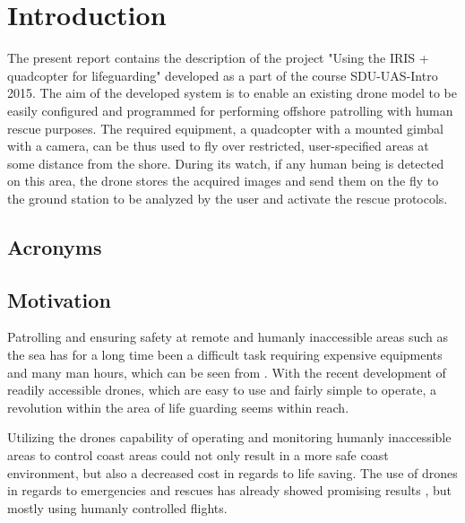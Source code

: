\chapter*{Introduction}

The present report contains the description of the  project "Using the IRIS + quadcopter for lifeguarding" developed as a part of the course  SDU-UAS-Intro 2015. 
The aim of the developed system is to enable an existing drone model to be easily configured and programmed for performing offshore patrolling with human rescue purposes. 
The required equipment, a quadcopter with a mounted gimbal with a camera, can be thus used to fly over restricted, user-specified areas at some distance from the shore. 
During its watch, if any human being is detected on this area, the drone stores the acquired images and send them on the fly to the ground station to be analyzed by the user and activate the rescue protocols. 

\section*{Acronyms}
\begin{acronym}[AWGN]
\end{acronym}

\section*{Motivation}
Patrolling and ensuring safety at remote and humanly inaccessible areas such as the sea has for a long time been a difficult task requiring expensive equipments and many man hours, which can be seen from \cite{Ref:Drone2}. With the recent development of readily accessible drones, which are easy to use and fairly simple to operate, a revolution within the area of life guarding seems within reach. 

Utilizing the drones capability of operating and monitoring humanly inaccessible areas to control coast areas could not only result in a more safe coast environment, but also a decreased cost in regards to life saving. The use of drones in regards to emergencies and rescues has already showed promising results \cite{Ref:Drone1} \cite{Ref:Drone3} \cite{Ref:Drone4} \cite{Ref:DroneResearch1} \cite{Ref:DroneResearch1}, but mostly using humanly controlled flights.

